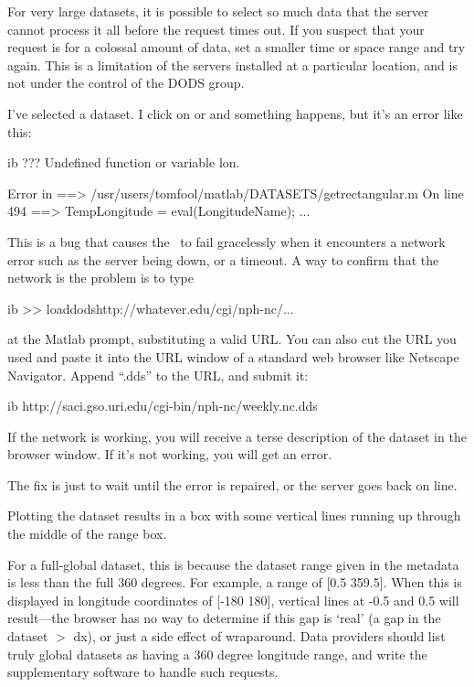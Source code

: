 For very large datasets, it is possible to select so much data that
the server cannot process it all before the request times out. If you
suspect that your request is for a colossal amount of data, set a
smaller time or space range and try again. This is a limitation of the
 servers installed at a particular location, and is not
under the control of the DODS group.

\problem  I've selected a dataset.    I click on  or  and something happens, but it's an error
like this:

\begin{vcode}{ib}
??? Undefined function or variable lon.

Error in ==> /usr/users/tomfool/matlab/DATASETS/getrectangular.m
On line 494  ==>          TempLongitude = eval(LongitudeName);
...
\end{vcode}

\fix  This is a bug that causes the \GUI\ to fail gracelessly when it 
encounters a network error such as the server being down, or a
timeout. A way to confirm that the network is the problem is to type 

\begin{vcode}{ib}
>> loaddods{http://whatever.edu/cgi/nph-nc/...}
\end{vcode}

at the Matlab prompt, substituting a valid URL.  You can also cut
the URL you used and paste it into the URL window of a standard web
browser like Netscape Navigator. Append ``.dds'' to the URL, and
submit it:

\begin{vcode}{ib}
http://saci.gso.uri.edu/cgi-bin/nph-nc/weekly.nc.dds
\end{vcode}

If the network is working, you will receive a terse description of the
dataset in the browser window. If it's not working, you will get an
error. 

The fix is just to wait until the error is repaired, or the server
goes back on line.

\problem Plotting the dataset results in a box with some 
vertical lines running up through the middle of the range box.

\fix  For a full-global dataset, this is because the 
dataset range given in the 
metadata is less than the full 360 degrees.  For example, a range of
[0.5 359.5].  When this is displayed in longitude coordinates of [-180
180], vertical lines at -0.5 and 0.5 will result---the browser has no
way to determine if this gap is `real' (a gap in the dataset $>$ dx), or
just a side effect of wraparound.  Data providers should list
truly global datasets as having a 360 degree longitude range, and 
write the supplementary software to handle such requests.

